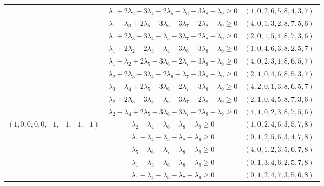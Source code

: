 \documentclass[12pt]{article}
\begin{document}
\begin{longtable}[l]{|c|c|c|}
 \cline{2-3} 
 & $\lambda_{1} + 2\lambda_{2}-3\lambda_{4}-2\lambda_{5}-\lambda_{6}-3\lambda_{8}-\lambda_{9}\geq 0$ & $(1 ,0 ,2 ,6 ,5 ,8 ,4 ,3 ,7) \;$\\ 
 \cline{2-3} 
 & $\lambda_{1}-\lambda_{3} + 2\lambda_{5}-3\lambda_{6}-3\lambda_{7}-2\lambda_{8}-\lambda_{9}\geq 0$ & $(4 ,0 ,1 ,3 ,2 ,8 ,7 ,5 ,6) \;$\\ 
 \cline{2-3} 
 & $\lambda_{1} + 2\lambda_{3}-3\lambda_{4}-\lambda_{5}-3\lambda_{7}-2\lambda_{8}-\lambda_{9}\geq 0$ & $(2 ,0 ,1 ,5 ,4 ,8 ,7 ,3 ,6) \;$\\ 
 \cline{2-3} 
 & $\lambda_{1} + 2\lambda_{2}-2\lambda_{3}-\lambda_{4}-3\lambda_{6}-3\lambda_{8}-\lambda_{9}\geq 0$ & $(1 ,0 ,4 ,6 ,3 ,8 ,2 ,5 ,7) \;$\\ 
 \cline{2-3} 
 & $\lambda_{1}-\lambda_{2} + 2\lambda_{5}-3\lambda_{6}-2\lambda_{7}-3\lambda_{8}-\lambda_{9}\geq 0$ & $(4 ,0 ,2 ,3 ,1 ,8 ,6 ,5 ,7) \;$\\ 
 \cline{2-3} 
 & $\lambda_{2} + 2\lambda_{3}-3\lambda_{4}-2\lambda_{6}-\lambda_{7}-3\lambda_{8}-\lambda_{9}\geq 0$ & $(2 ,1 ,0 ,4 ,6 ,8 ,5 ,3 ,7) \;$\\ 
 \cline{2-3} 
 & $\lambda_{3}-\lambda_{4} + 2\lambda_{5}-3\lambda_{6}-2\lambda_{7}-3\lambda_{8}-\lambda_{9}\geq 0$ & $(4 ,2 ,0 ,1 ,3 ,8 ,6 ,5 ,7) \;$\\ 
 \cline{2-3} 
 & $\lambda_{2} + 2\lambda_{3}-3\lambda_{4}-\lambda_{6}-3\lambda_{7}-2\lambda_{8}-\lambda_{9}\geq 0$ & $(2 ,1 ,0 ,4 ,5 ,8 ,7 ,3 ,6) \;$\\ 
 \cline{2-3} 
 & $\lambda_{2}-\lambda_{4} + 2\lambda_{5}-3\lambda_{6}-3\lambda_{7}-2\lambda_{8}-\lambda_{9}\geq 0$ & $(4 ,1 ,0 ,2 ,3 ,8 ,7 ,5 ,6) \;$\\ \hline\multirow{7}{*}{ $(1 ,0 ,0 ,0 ,0 ,-1 ,-1 ,-1 ,-1) \;$ }  & $\lambda_{2}-\lambda_{4}-\lambda_{6}-\lambda_{8}-\lambda_{9}\geq 0$ & $(1 ,0 ,2 ,4 ,6 ,3 ,5 ,7 ,8) \;$\\ 
 \cline{2-3} 
 & $\lambda_{1}-\lambda_{4}-\lambda_{5}-\lambda_{8}-\lambda_{9}\geq 0$ & $(0 ,1 ,2 ,5 ,6 ,3 ,4 ,7 ,8) \;$\\ 
 \cline{2-3} 
 & $\lambda_{5}-\lambda_{6}-\lambda_{7}-\lambda_{8}-\lambda_{9}\geq 0$ & $(4 ,0 ,1 ,2 ,3 ,5 ,6 ,7 ,8) \;$\\ 
 \cline{2-3} 
 & $\lambda_{1}-\lambda_{3}-\lambda_{6}-\lambda_{8}-\lambda_{9}\geq 0$ & $(0 ,1 ,3 ,4 ,6 ,2 ,5 ,7 ,8) \;$\\ 
 \cline{2-3} 
 & $\lambda_{1}-\lambda_{4}-\lambda_{6}-\lambda_{7}-\lambda_{9}\geq 0$ & $(0 ,1 ,2 ,4 ,7 ,3 ,5 ,6 ,8) \;$\\ 
 \cline{2-3} 

\end{longtable}
\end{document}
